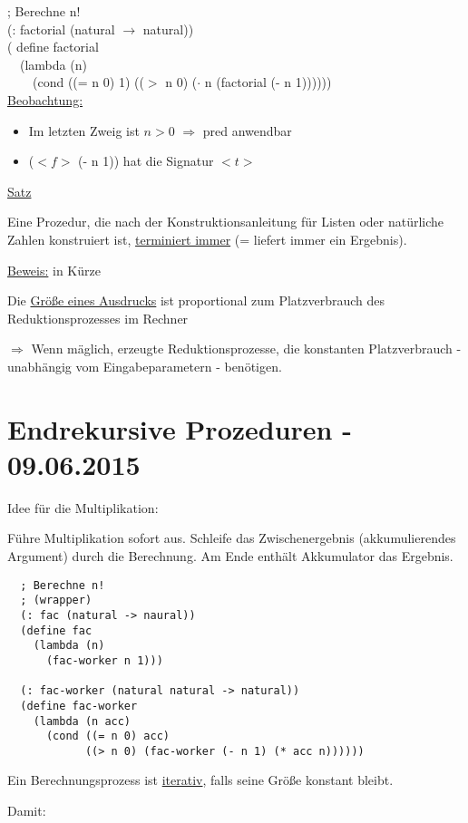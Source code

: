 \documentclass[a4paper, 20pt, openany]{book}
\begin{document}
; Berechne n! \\
(: factorial (natural $\rightarrow$ natural)) \\
( define factorial \\
\ \ (lambda (n)  \\
\ \ \ \ (cond ((= n 0) 1) (($>$ n 0) ($\cdot$ n (factorial (- n 1)))))) \\

\underline{Beobachtung:}

\begin{itemize}
  \item Im letzten Zweig ist $n>0$ $\Rightarrow$ pred anwendbar 
  \item ($<f>$ (- n 1)) hat die Signatur $<t>$
\end{itemize}

\underline{Satz}

Eine Prozedur, die nach der Konstruktionsanleitung für Listen oder natürliche Zahlen konstruiert ist, \underline{terminiert immer} (= liefert immer ein Ergebnis).

\underline{Beweis:} in Kürze

Die \underline{Größe eines Ausdrucks} ist proportional zum Platzverbrauch des Reduktionsprozesses im Rechner

$\Rightarrow$ Wenn mäglich, erzeugte Reduktionsprozesse, die konstanten Platzverbrauch - unabhängig vom Eingabeparametern - benötigen.

\chapter{Endrekursive Prozeduren - 09.06.2015}
Idee für die Multiplikation:

Führe Multiplikation sofort aus. Schleife das Zwischenergebnis (akkumulierendes Argument) durch die Berechnung. Am Ende enthält Akkumulator das Ergebnis.

\begin{lstlisting}
  ; Berechne n!
  ; (wrapper)
  (: fac (natural -> naural))
  (define fac
    (lambda (n)
      (fac-worker n 1)))
      
  (: fac-worker (natural natural -> natural))
  (define fac-worker
    (lambda (n acc)
      (cond ((= n 0) acc)
            ((> n 0) (fac-worker (- n 1) (* acc n))))))
\end{lstlisting}

Ein Berechnungsprozess ist \underline{iterativ}, falls seine Größe konstant bleibt.

Damit:
\end{document}
